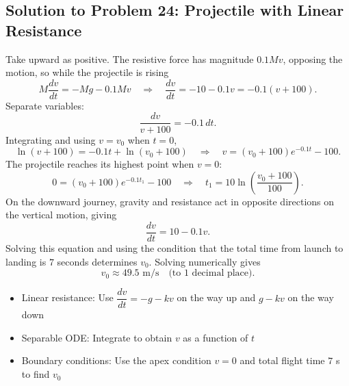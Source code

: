 \subsection{Solution to Problem 24: Projectile with Linear Resistance}

\begin{solution}
Take upward as positive. The resistive force has magnitude $0.1Mv$, opposing the motion, so while the projectile is rising
\[
M\frac{dv}{dt} = -Mg - 0.1Mv
\quad\Longrightarrow\quad
\frac{dv}{dt} = -10 - 0.1v = -0.1(v + 100).
\]
Separate variables:
\[
\frac{dv}{v + 100} = -0.1\,dt.
\]
Integrating and using $v = v_0$ when $t = 0$,
\[
\ln(v + 100) = -0.1t + \ln(v_0 + 100)
\quad\Longrightarrow\quad
v = (v_0 + 100)e^{-0.1t} - 100.
\]
The projectile reaches its highest point when $v = 0$:
\[
0 = (v_0 + 100)e^{-0.1t_1} - 100
\quad\Longrightarrow\quad
t_1 = 10\ln\left(\frac{v_0 + 100}{100}\right).
\]
On the downward journey, gravity and resistance act in opposite directions on the vertical motion, giving
\[
\frac{dv}{dt} = 10 - 0.1v.
\]
Solving this equation and using the condition that the total time from launch to landing is $7$ seconds determines $v_0$. Solving numerically gives
\[
v_0 \approx 49.5 \text{ m/s} \quad \text{(to 1 decimal place)}.
\]
\end{solution}

\begin{takeaways}
\begin{itemize}
    \item Linear resistance: Use $\dfrac{dv}{dt} = -g - kv$ on the way up and $g - kv$ on the way down
    \item Separable ODE: Integrate to obtain $v$ as a function of $t$
    \item Boundary conditions: Use the apex condition $v = 0$ and total flight time $7$ s to find $v_0$
\end{itemize}
\end{takeaways}
